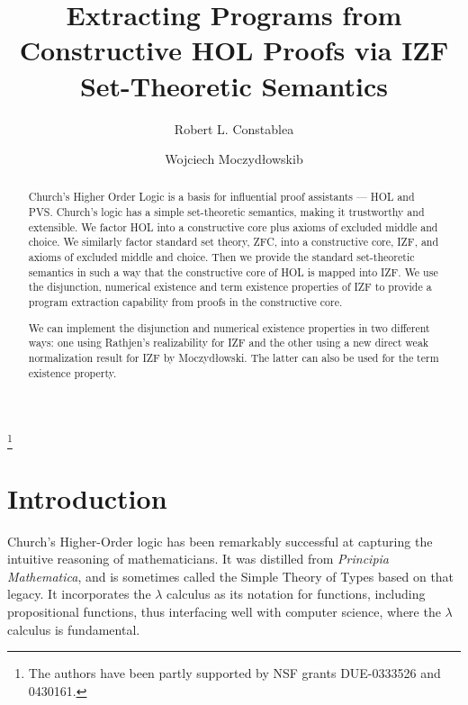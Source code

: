 \documentclass{LMCS}
\begin{document}
\title{Extracting Programs from Constructive HOL Proofs via IZF
Set-Theoretic Semantics}

\author[R.L.~Constable]{Robert L. Constable\rsuper a}
\address{{}Department of Computer Science, Cornell University, Ithaca, NY,14853, USA}

\author[W.~Moczyd\l owski]{Wojciech Moczyd\l owski\rsuper b}
\thanks{{}The authors have been partly supported by NSF grants DUE-0333526 and 0430161.}

\titlecomment{}

\begin{abstract} 
\noindent Church's Higher Order Logic is a basis for influential proof
assistants --- HOL and PVS.  Church's logic has a simple set-theoretic
semantics, making it trustworthy and extensible.  We factor HOL into a
constructive core plus axioms of excluded middle and choice. We
similarly factor standard set theory, ZFC, into a constructive core,
IZF, and axioms of excluded middle and choice. Then we provide the
standard set-theoretic semantics in such a way that the constructive
core of HOL is mapped into IZF.  We use the disjunction, numerical
existence and term existence properties of IZF to provide a program 
extraction capability from proofs in the constructive core.

We can implement the disjunction and numerical existence properties in two
different ways: one using Rathjen's realizability for IZF and the
other using a new direct weak normalization result for IZF by Moczyd\l owski. 
The latter can also be used for the term existence property. 
\end{abstract}

\maketitle

\section{Introduction} 

Church's Higher-Order logic \cite{Chu40,Lei94c} has been remarkably successful
at capturing the intuitive reasoning of mathematicians.  It was
distilled from {\em Principia Mathematica}, and is sometimes called the
Simple Theory of Types based on that legacy.  It incorporates the $\lambda$
calculus as its notation for functions, including propositional functions,
thus interfacing well with computer science, where the $\lambda$ calculus is
fundamental. 
\end{document}
